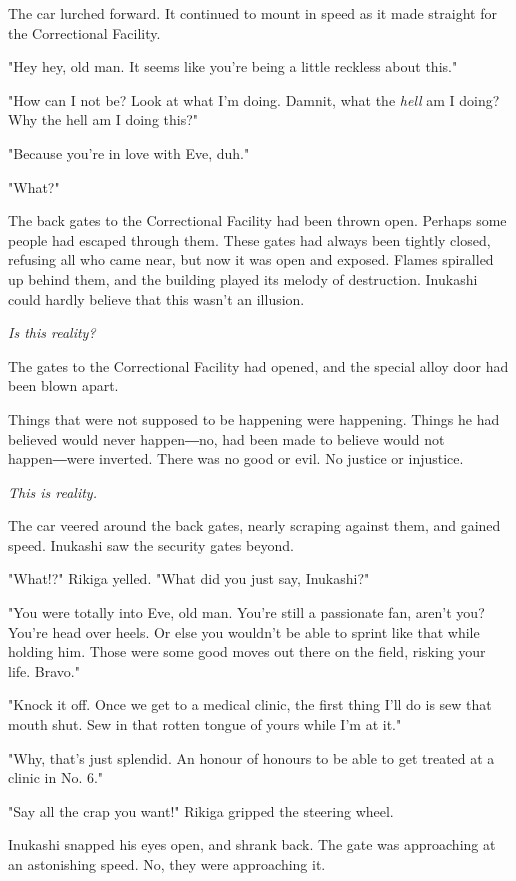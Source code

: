 The car lurched forward. It continued to mount in speed as it made
straight for the Correctional Facility.

"Hey hey, old man. It seems like you're being a little reckless about
this."

"How can I not be? Look at what I'm doing. Damnit, what the \emph{hell} am I
doing? Why the hell am I doing this?"

"Because you're in love with Eve, duh."

"What?"

The back gates to the Correctional Facility had been thrown open.
Perhaps some people had escaped through them. These gates had always
been tightly closed, refusing all who came near, but now it was open and
exposed. Flames spiralled up behind them, and the building played its
melody of destruction. Inukashi could hardly believe that this wasn't an
illusion.

\emph{Is this reality?}

The gates to the Correctional Facility had opened, and the special alloy
door had been blown apart.

Things that were not supposed to be happening were happening. Things he
had believed would never happen―no, had been made to believe would not
happen―were inverted. There was no good or evil. No justice or
injustice.

\emph{This is reality.}

The car veered around the back gates, nearly scraping against them, and
gained speed. Inukashi saw the security gates beyond.

"What!?" Rikiga yelled. "What did you just say, Inukashi?"

"You were totally into Eve, old man. You're still a passionate fan,
aren't you? You're head over heels. Or else you wouldn't be able to
sprint like that while holding him. Those were some good moves out there
on the field, risking your life. Bravo."

"Knock it off. Once we get to a medical clinic, the first thing I'll do
is sew that mouth shut. Sew in that rotten tongue of yours while I'm at
it."

"Why, that's just splendid. An honour of honours to be able to get
treated at a clinic in No. 6."

"Say all the crap you want!" Rikiga gripped the steering wheel.

Inukashi snapped his eyes open, and shrank back. The gate was
approaching at an astonishing speed. No, they were approaching it.

